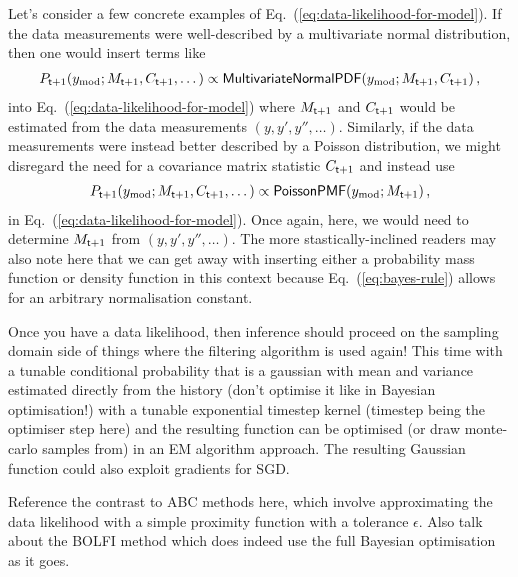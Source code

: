 Let's consider a few concrete examples of Eq.~(\ref{eq:data-likelihood-for-model}). If the data measurements were well-described by a multivariate normal distribution, then one would insert terms like
\begin{align}
P_{{\sf t}+1}(y_{\rm mod};M_{{\sf t}+1},C_{{\sf t}+1},\dots ) \propto {\sf MultivariateNormalPDF}(y_{\rm mod};M_{{\sf t}+1},C_{{\sf t}+1})\,,
\end{align}
into Eq.~(\ref{eq:data-likelihood-for-model}) where $M_{{\sf t}+1}$ and $C_{{\sf t}+1}$ would be estimated from the data measurements $(y, y', y'', \dots)$. Similarly, if the data measurements were instead better described by a Poisson distribution, we might disregard the need for a covariance matrix statistic $C_{{\sf t}+1}$ and instead use
\begin{align}
P_{{\sf t}+1}(y_{\rm mod};M_{{\sf t}+1},C_{{\sf t}+1},\dots ) \propto {\sf PoissonPMF}(y_{\rm mod};M_{{\sf t}+1})\,,
\end{align}
in Eq.~(\ref{eq:data-likelihood-for-model}). Once again, here, we would need to determine $M_{{\sf t}+1}$ from $(y, y', y'', \dots)$. The more stastically-inclined readers may also note here that we can get away with inserting either a probability mass function or density function in this context because Eq.~(\ref{eq:bayes-rule}) allows for an arbitrary normalisation constant.

Once you have a data likelihood, then inference should proceed on the sampling domain side of things where the filtering algorithm is used again! This time with a tunable conditional probability that is a gaussian with mean and variance estimated directly from the history (don't optimise it like in Bayesian optimisation!) with a tunable exponential timestep kernel (timestep being the optimiser step here) and the resulting function can be optimised (or draw monte-carlo samples from) in an EM algorithm approach. The resulting Gaussian function could also exploit gradients for SGD.

Reference the contrast to ABC methods here, which involve approximating the data likelihood with a simple proximity function with a tolerance $\epsilon$. Also talk about the BOLFI method which does indeed use the full Bayesian optimisation as it goes.


